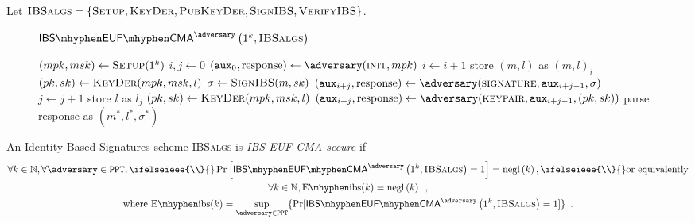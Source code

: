   Let $\textsc{IBSalgs} = \{\textsc{Setup}, \textsc{KeyDer}, \textsc{PubKeyDer},
  \textsc{SignIBS}, \textsc{VerifyIBS}\}$.

  \begin{figure}[!htbp]
    \begin{gamebox}{$\mathsf{IBS \mhyphen EUF \mhyphen
    CMA}^{\adversary}\left(1^k, \textsc{IBSalgs}\right)$}
      \begin{algorithmic}[1]
        \State $(mpk, msk) \gets \textsc{Setup}(1^k)$
        \State $i, j \gets 0$
        \State $(\mathtt{aux}_0, \mathrm{response}) \gets
        \adversary(\textsc{init}, mpk)$
            \State $i \gets i + 1$
            \State store $(m, l)$ as $(m, l)_i$
            \State $(pk, sk) \gets \textsc{KeyDer}(mpk, msk, l)$
            \State $\sigma \gets \textsc{SignIBS}(m, sk)$
            \State $(\mathtt{aux}_{i+j}, \mathrm{response}) \gets
            \adversary(\textsc{signature}, \mathtt{aux}_{i+j-1}, \sigma)$
          \Else \ 
            \State $j \gets j + 1$
            \State store $l$ as $l_j$
            \State $(pk, sk) \gets \textsc{KeyDer}(mpk, msk, l)$
            \State $(\mathtt{aux}_{i+j}, \mathrm{response}) \gets
            \adversary(\textsc{keypair}, \mathtt{aux}_{i+j-1}, (pk, sk))$
          \EndIf
        \EndWhile
        \State parse response as $(m^*, l^*, \sigma^*)$
          \State {}
        \Else
          \State {}
        \EndIf
      \end{algorithmic}
    \end{gamebox}
    \caption{}
    \label{game:ibs}
  \end{figure}
  \begin{definition}
    \label{def:ibs:secure}
    An Identity Based Signatures scheme \textsc{IBSalgs} is
    \emph{\textsf{IBS-EUF-CMA}-secure} if
    \begin{gather*}
      \forall k \in \mathbb{N}, \forall \adversary \in \mathtt{PPT},
      \ifelseieee{\\}{}
      \Pr\left[\mathsf{IBS \mhyphen EUF \mhyphen
      CMA}^{\adversary}\left(1^k, \textsc{IBSalgs}\right) = 1\right] =
      \mathrm{negl}\left(k\right),
      \ifelseieee{\\}{}
      \text{or equivalently} \\
      \forall k \in \mathbb{N}, \mathrm{E \mhyphen ibs}(k) =
      \mathrm{negl}\left(k\right) \enspace, \\
      \text{where } \mathrm{E \mhyphen ibs}(k) = \underset{\adversary \in
      \mathtt{PPT}}{\sup}\{\Pr[\mathsf{IBS \mhyphen EUF \mhyphen
      CMA}^{\adversary}\left(1^k, \textsc{IBSalgs}\right) = 1]\} \enspace.
    \end{gather*}
  \end{definition}

